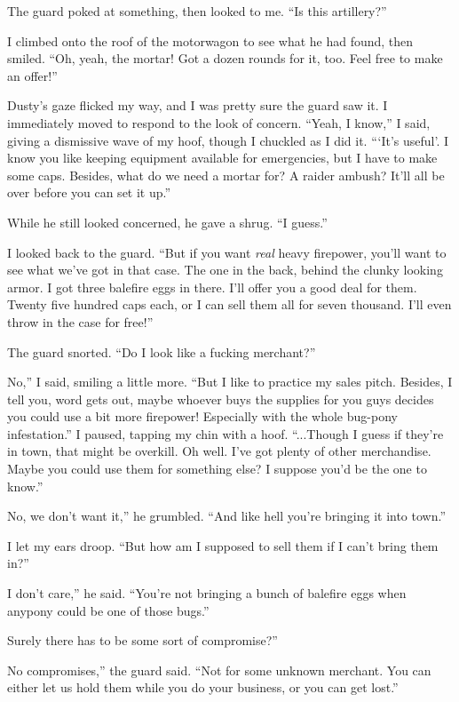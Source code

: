 The guard poked at something, then looked to me. “Is this artillery?”

I climbed onto the roof of the motorwagon to see what he had found, then smiled. “Oh, yeah, the mortar! Got a dozen rounds for it, too. Feel free to make an offer!”

Dusty’s gaze flicked my way, and I was pretty sure the guard saw it. I immediately moved to respond to the look of concern. “Yeah, I know,” I said, giving a dismissive wave of my hoof, though I chuckled as I did it. “‘It’s useful’. I know you like keeping equipment available for emergencies, but I have to make some caps. Besides, what do we need a mortar for? A raider ambush? It’ll all be over before you can set it up.”

While he still looked concerned, he gave a shrug. “I guess.”

I looked back to the guard. “But if you want \textit{real} heavy firepower, you’ll want to see what we’ve got in that case. The one in the back, behind the clunky looking armor. I got three balefire eggs in there. I’ll offer you a good deal for them. Twenty five hundred caps each, or I can sell them all for seven thousand. I’ll even throw in the case for free!”

The guard snorted. “Do I look like a fucking merchant?”

\leavevmode{}No,” I said, smiling a little more. “But I like to practice my sales pitch. Besides, I tell you, word gets out, maybe whoever buys the supplies for you guys decides you could use a bit more firepower! Especially with the whole bug-pony infestation.” I paused, tapping my chin with a hoof. “...Though I guess if they’re in town, that might be overkill. Oh well. I’ve got plenty of other merchandise. Maybe you could use them for something else? I suppose you’d be the one to know.”

\leavevmode{}No, we don’t want it,” he grumbled. “And like hell you’re bringing it into town.”

I let my ears droop. “But how am I supposed to sell them if I can’t bring them in?”

\leavevmode{}I don’t care,” he said. “You’re not bringing a bunch of balefire eggs when anypony could be one of those bugs.”

\leavevmode{}Surely there has to be some sort of compromise?”

\leavevmode{}No compromises,” the guard said. “Not for some unknown merchant. You can either let us hold them while you do your business, or you can get lost.”

